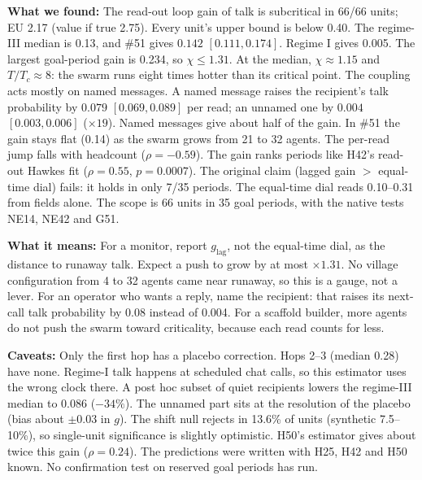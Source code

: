 \textbf{What we found:} The read-out loop gain of talk is subcritical in 66/66 units; EU 2.17 (value if true 2.75). Every unit's upper bound is below 0.40. The regime-III median is 0.13, and \#51 gives $0.142$ $[0.111, 0.174]$. Regime I gives 0.005. The largest goal-period gain is 0.234, so $\chi\le1.31$. At the median, $\chi\approx1.15$ and $T/T_c\approx8$: the swarm runs eight times hotter than its critical point. The coupling acts mostly on named messages. A named message raises the recipient's talk probability by $0.079$ $[0.069, 0.089]$ per read; an unnamed one by $0.004$ $[0.003, 0.006]$ ($\times19$). Named messages give about half of the gain. In \#51 the gain stays flat (0.14) as the swarm grows from 21 to 32 agents. The per-read jump falls with headcount ($\rho=-0.59$). The gain ranks periods like H42's read-out Hawkes fit ($\rho=0.55$, $p=0.0007$). The original claim (lagged gain $>$ equal-time dial) fails: it holds in only 7/35 periods. The equal-time dial reads 0.10--0.31 from fields alone.
The scope is 66 units in 35 goal periods, with the native tests NE14, NE42 and G51.

\textbf{What it means:} For a monitor, report $g_\mathrm{lag}$, not the equal-time dial, as the distance to runaway talk. Expect a push to grow by at most $\times1.31$. No village configuration from 4 to 32 agents came near runaway, so this is a gauge, not a lever. For an operator who wants a reply, name the recipient: that raises its next-call talk probability by 0.08 instead of 0.004. For a scaffold builder, more agents do not push the swarm toward criticality, because each read counts for less.

\textbf{Caveats:} Only the first hop has a placebo correction. Hops 2--3 (median 0.28) have none. Regime-I talk happens at scheduled chat calls, so this estimator uses the wrong clock there. A post hoc subset of quiet recipients lowers the regime-III median to 0.086 ($-34\%$). The unnamed part sits at the resolution of the placebo (bias about $\pm0.03$ in $g$). The shift null rejects in 13.6\% of units (synthetic 7.5--10\%), so single-unit significance is slightly optimistic. H50's estimator gives about twice this gain ($\rho=0.24$). The predictions were written with H25, H42 and H50 known. No confirmation test on reserved goal periods has run.
